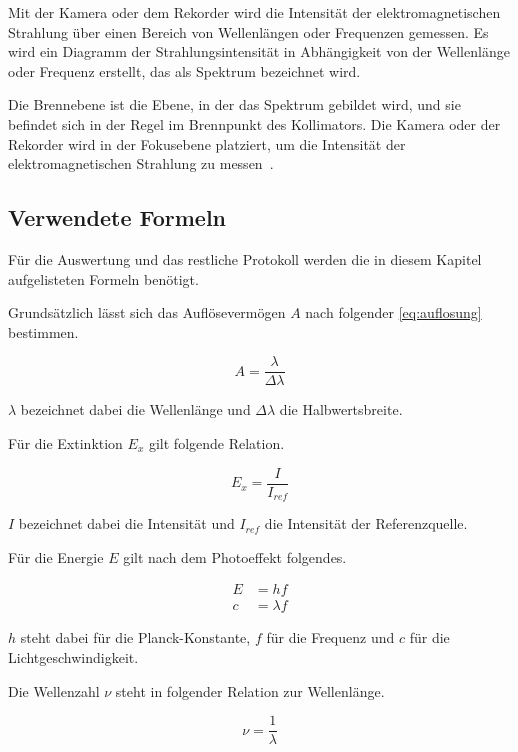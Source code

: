\documentclass[12pt,english,ngerman]{scrartcl}
\begin{document}
Mit der Kamera oder dem Rekorder wird die Intensität der elektromagnetischen
Strahlung über einen Bereich von Wellenlängen oder Frequenzen gemessen. Es wird
ein Diagramm der Strahlungsintensität in Abhängigkeit von der Wellenlänge oder
Frequenz erstellt, das als Spektrum bezeichnet wird.

Die Brennebene ist die Ebene, in der das Spektrum gebildet wird, und sie
befindet sich in der Regel im Brennpunkt des Kollimators. Die Kamera oder der
Rekorder wird in der Fokusebene platziert, um die Intensität der
elektromagnetischen Strahlung zu messen~\cite{noauthor_spectrograph_2016}.

\subsection{Verwendete Formeln}

Für die Auswertung und das restliche Protokoll werden die in diesem Kapitel
aufgelisteten Formeln benötigt.

Grundsätzlich lässt sich das Auflösevermögen $A$ nach folgender
\autoref{eq:auflosung} bestimmen.

\begin{equation}
	A = \frac{\lambda}{\Delta\lambda}
	\label{eq:auflosung}
\end{equation}

$\lambda$ bezeichnet dabei die Wellenlänge und $\Delta\lambda$ die Halbwertsbreite.

Für die Extinktion $E_x$ gilt folgende Relation.

\begin{equation}
	E_x = \frac{I}{I_{ref}}
	\label{eq:extinktion}
\end{equation}

$I$ bezeichnet dabei die Intensität und $I_{ref}$ die Intensität der Referenzquelle.

Für die Energie $E$ gilt nach dem Photoeffekt folgendes.

\begin{align}
	E & = h f                          \\
	c & = \lambda f \label{eq:energie}
\end{align}

$h$ steht dabei für die Planck-Konstante, $f$ für die Frequenz und $c$ für die Lichtgeschwindigkeit.

Die Wellenzahl $\nu$ steht in folgender Relation zur Wellenlänge.

\begin{equation}
	\nu = \frac{1}{\lambda}
	\label{eq:wellenzahl}
\end{equation}
\end{document}
